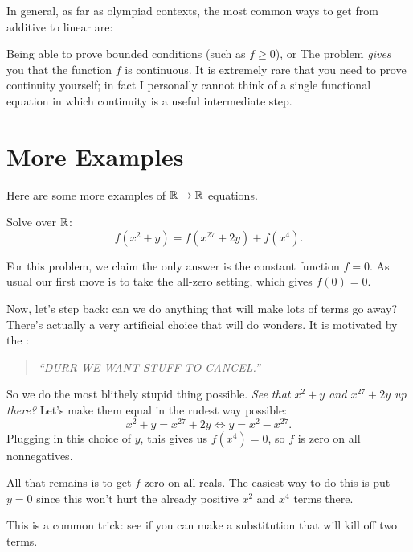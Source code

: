\documentclass[11pt]{scrartcl}
\begin{document}
In general, as far as olympiad contexts, the most common ways
to get from additive to linear are:
\begin{itemize}
  \ii Being able to prove bounded conditions (such as $f \ge 0$), or
  \ii The problem \emph{gives} you that the function $f$ is continuous.
  It is extremely rare that you need to prove continuity yourself;
  in fact I personally cannot think of a single functional equation in which
  continuity is a useful intermediate step.
\end{itemize}

\section{More Examples}
Here are some more examples of $\mathbb R \to \mathbb R$ equations.
\begin{example}
   \label{ex:david_yang}
  Solve over $\mathbb R$: \[ f(x^2+y) = f(x^{27} + 2y) + f(x^4). \]
\end{example}
\begin{soln}
  For this problem, we claim the only answer is the constant function $f=0$.
  As usual our first move is to take the all-zero setting, which gives $f(0) = 0$.

  Now, let's step back: can we do anything that will make lots of terms go away?
  There's actually a very artificial choice that will do wonders.
  It is motivated by the :
  \begin{quote}
    \itshape ``DURR WE WANT STUFF TO CANCEL.''
  \end{quote}
  So we do the most blithely stupid thing possible.
  \emph{See that $x^2+y$ and $x^{27}+2y$ up there?}
  Let's make them equal in the rudest way possible:
  \[ x^2 + y = x^{27} + 2y \iff y = x^2 - x^{27}. \]
  Plugging in this choice of $y$,
  this gives us $f(x^4) = 0$, so $f$ is zero on all nonnegatives.

  All that remains is to get $f$ zero on all reals.
  The easiest way to do this is put $y=0$ since this won't
  hurt the already positive $x^2$ and $x^4$ terms there.
\end{soln}
This is a common trick: see if you can make a substitution that will kill off two terms.
\end{document}
